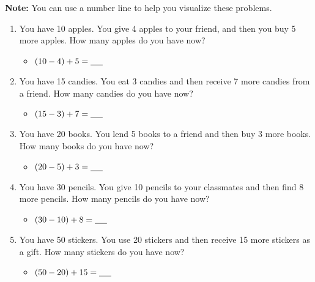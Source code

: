 \textbf{Note:} You can use a number line to help you visualize these problems. 
\noindent
\begin{center}
    \end{center}
    
\begin{enumerate}   
    \item You have 10 apples. You give 4 apples to your friend, and then you buy 5 more apples. How many apples do you have now?
    \begin{itemize}
        \item $(10 - 4) + 5 = \underline{\hspace{0.5cm}}$
    \end{itemize}
    \item You have 15 candies. You eat 3 candies and then receive 7 more candies from a friend. How many candies do you have now?
    \begin{itemize}
        \item $(15 - 3) + 7 = \underline{\hspace{0.5cm}}$
    \end{itemize}    
    \item You have 20 books. You lend 5 books to a friend and then buy 3 more books. How many books do you have now?
    \begin{itemize}
        \item $(20 - 5) + 3 = \underline{\hspace{0.5cm}}$
    \end{itemize}
    \item You have 30 pencils. You give 10 pencils to your classmates and then find 8 more pencils. How many pencils do you have now?
    \begin{itemize}
        \item $(30 - 10) + 8 = \underline{\hspace{0.5cm}}$
    \end{itemize}
    \item You have 50 stickers. You use 20 stickers and then receive 15 more stickers as a gift. How many stickers do you have now?
    \begin{itemize}
        \item $(50 - 20) + 15 = \underline{\hspace{0.5cm}}$

\end{itemize}
\end{enumerate}

